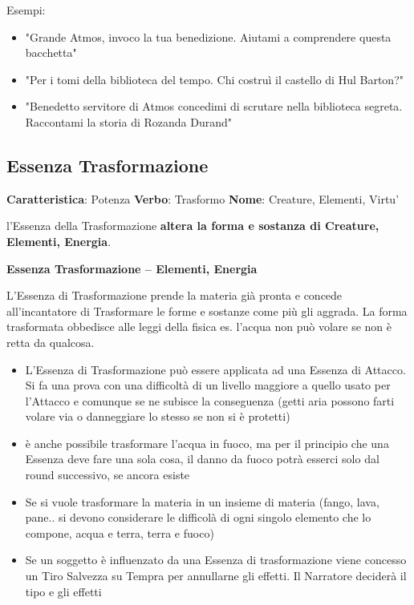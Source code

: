 \documentclass[a4paper,11pt,twoside,openany]{book}
\begin{document}
\bigskip

Esempi:
\begin{itemize}
	\item
	      "Grande Atmos, invoco la tua benedizione. Aiutami a comprendere questa bacchetta"
	\item
	      "Per i tomi della biblioteca del tempo. Chi costruì il castello di Hul Barton?"
	\item
	      "Benedetto servitore di Atmos concedimi di scrutare nella biblioteca segreta. Raccontami la storia di Rozanda Durand"
\end{itemize}
\pagebreak


\subsection{Essenza Trasformazione}

\textbf{Caratteristica}: Potenza
\textbf{Verbo}: Trasformo
\textbf{Nome}: Creature, Elementi, Virtu'

\label{essenza-trasformazione---potenza}

l'Essenza della Trasformazione \textbf{altera la forma e sostanza di Creature, Elementi, Energia}.

\bigskip

\textbf{Essenza Trasformazione -- Elementi, Energia}

L'Essenza di Trasformazione prende la materia già pronta e concede all'incantatore di Trasformare le forme e sostanze come più gli aggrada. La forma trasformata obbedisce alle leggi della fisica es. l'acqua non può volare se non è retta da qualcosa.

\begin{itemize}
	\item
	      L'Essenza di Trasformazione può essere applicata ad una Essenza di Attacco. Si fa una prova con una difficoltà di un livello maggiore a quello usato per l'Attacco e comunque se ne subisce la conseguenza (getti aria possono farti volare via o danneggiare lo stesso se non si è protetti)
	\item
	      è anche possibile trasformare l'acqua in fuoco, ma per il principio che una Essenza deve fare una sola cosa, il danno da fuoco potrà esserci solo dal round successivo, se ancora esiste
	\item
	      Se si vuole trasformare la materia in un insieme di materia (fango, lava, pane.. si devono considerare le difficolà di ogni singolo elemento che lo compone, acqua e terra, terra e fuoco)
	\item
	      Se un soggetto è influenzato da una Essenza di trasformazione viene concesso un Tiro Salvezza su Tempra per annullarne gli effetti. Il Narratore deciderà il tipo e gli effetti
\end{itemize}
\end{document}

